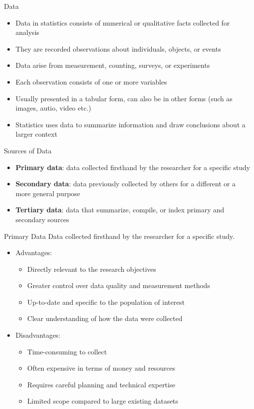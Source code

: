 \documentclass[12pt, aspectratio=169]{beamer}
\begin{document}
	\begin{frame}{Data}
		\begin{itemize}
			\item Data in statistics consists of numerical or qualitative facts collected for analysis
			\item They are recorded observations about individuals, objects, or events
			\item Data arise from measurement, counting, surveys, or experiments
			\item Each observation consists of one or more variables
			\item Usually presented in a tabular form, can also be in other forms (such as images, autio, video etc.)
			\item Statistics uses data to summarize information and draw conclusions about a larger context
		\end{itemize}
	\end{frame}

	
	\begin{frame}{Sources of Data}
		\begin{itemize}
			\item \textbf{Primary data}: data collected firsthand by the researcher for a specific study
			\item \textbf{Secondary data}: data previously collected by others for a different or a more general purpose
			\item \textbf{Tertiary data}: data that summarize, compile, or index primary and secondary sources
		\end{itemize}
	\end{frame}


	\begin{frame}{Primary Data}
		Data collected firsthand by the researcher for a specific study.
		\begin{itemize}
			\item Advantages:
			\begin{itemize}
				\item Directly relevant to the research objectives
				\item Greater control over data quality and measurement methods
				\item Up-to-date and specific to the population of interest
				\item Clear understanding of how the data were collected
			\end{itemize}
			\item Disadvantages:
			\begin{itemize}
				\item Time-consuming to collect
				\item Often expensive in terms of money and resources
				\item Requires careful planning and technical expertise
				\item Limited scope compared to large existing datasets
			\end{itemize}
		\end{itemize}
	\end{frame}
\end{document}
